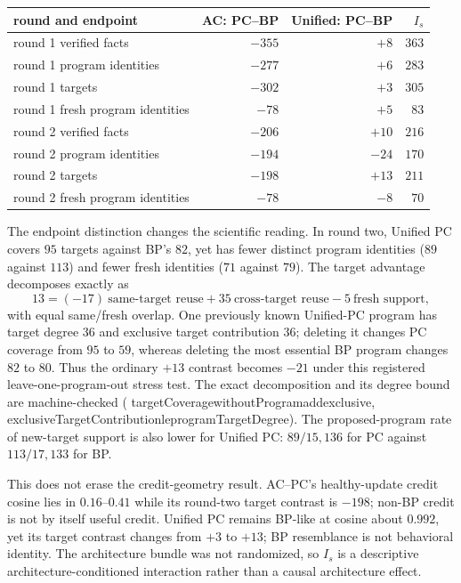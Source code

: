 \documentclass[11pt]{article}
\newcommand{\leanname}[1]{{\scriptsize\ttfamily
  \def\_{\textunderscore\allowbreak}#1}}
\begin{document}
\begin{center}\small
\begin{tabular}{@{}lrrr@{}}
\toprule
round and endpoint & AC: PC--BP & Unified: PC--BP & $I_s$ \\
\midrule
round 1 verified facts & $-355$ & $+8$ & $363$ \\
round 1 program identities & $-277$ & $+6$ & $283$ \\
round 1 targets & $-302$ & $+3$ & $305$ \\
round 1 fresh program identities & $-78$ & $+5$ & $83$ \\
\midrule
round 2 verified facts & $-206$ & $+10$ & $216$ \\
round 2 program identities & $-194$ & $-24$ & $170$ \\
round 2 targets & $-198$ & $+13$ & $211$ \\
round 2 fresh program identities & $-78$ & $-8$ & $70$ \\
\bottomrule
\end{tabular}
\end{center}

The endpoint distinction changes the scientific reading. In round two, Unified PC
covers $95$ targets against BP's $82$, yet has fewer distinct program identities
($89$ against $113$) and fewer fresh identities ($71$ against $79$). The target
advantage decomposes exactly as
\[
 13=(-17)\ \text{same-target reuse}
       +35\ \text{cross-target reuse}
       -5\ \text{fresh support},
\]
with equal same/fresh overlap. One previously known Unified-PC program has target
degree $36$ and exclusive target contribution $36$; deleting it changes PC coverage
from $95$ to $59$, whereas deleting the most essential BP program changes $82$ to
$80$. Thus the ordinary $+13$ contrast becomes $-21$ under this registered
leave-one-program-out stress test. The exact decomposition and its degree bound are
machine-checked
(\leanname{targetCoverage\_withoutProgram\_add\_exclusive},
\leanname{exclusiveTargetContribution\_le\_programTargetDegree}).
The proposed-program rate of new-target support is also lower for Unified PC:
$89/15{,}136$ for PC against $113/17{,}133$ for BP.

This does not erase the credit-geometry result. AC--PC's healthy-update credit cosine
lies in $0.16$--$0.41$ while its round-two target contrast is $-198$; non-BP credit is
not by itself useful credit. Unified PC remains BP-like at cosine about $0.992$, yet
its target contrast changes from $+3$ to $+13$; BP resemblance is not behavioral
identity. The architecture bundle was not randomized, so $I_s$ is a descriptive
architecture-conditioned interaction rather than a causal architecture effect.
\end{document}
